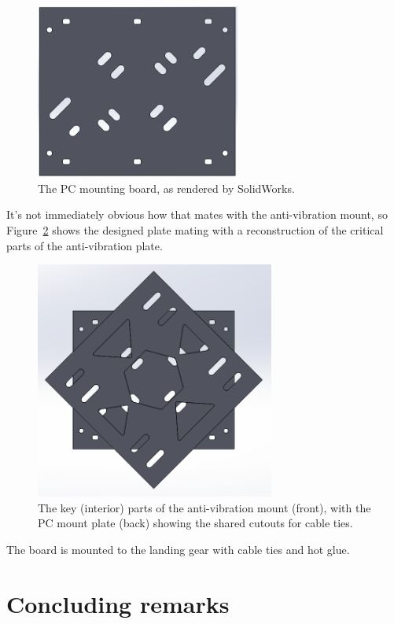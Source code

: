\documentclass[12pt,oneside,a4paper]{book}
\begin{document}
\begin{figure}[h]
  \centering
    \includegraphics[width=0.6\textwidth]{figs/pc-mount}
  \caption{The PC mounting board, as rendered by SolidWorks.}
  \label{fig:pc-mount}
\end{figure}

It's not immediately obvious how that mates with the anti-vibration
mount, so Figure~\ref{fig:pc-avm-mount} shows the designed plate
mating with a reconstruction of the critical parts of the
anti-vibration plate.

\begin{figure}[h]
  \centering
  \includegraphics[width=0.7\textwidth]{figs/pc-avm}
  \caption{The key (interior) parts of the anti-vibration mount (front), with the PC mount plate (back) showing the shared cutouts for cable ties.}
  \label{fig:pc-avm-mount}
\end{figure}
The board is mounted to the landing gear with cable ties and hot glue.
\newpage~\newpage
\section{Concluding remarks}
\label{sec:concluding-remarks}
\end{document}
